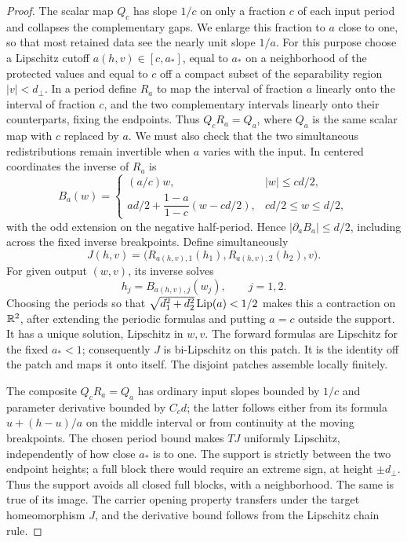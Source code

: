 \begin{proof}
The scalar map $Q_c$ has slope $1/c$ on only a fraction $c$ of each
input period and collapses the complementary gaps.  We enlarge this
fraction to $a$ close to one, so that most retained data see the nearly
unit slope $1/a$.  For this purpose choose a Lipschitz cutoff
$a(h,v)\in[c,a_*]$, equal to $a_*$ on a
neighborhood of the protected values and equal to $c$ off a compact
subset of the separability region $|v|<d_\perp$.  In a period define
$R_a$ to map the interval of fraction $a$ linearly onto the interval of
fraction $c$, and the two complementary intervals linearly onto their
counterparts, fixing the endpoints.  Thus $Q_cR_a=Q_a$, where $Q_a$
is the same scalar map with $c$ replaced by $a$.
We must also check that the two simultaneous redistributions remain
invertible when $a$ varies with the input.  In centered coordinates
the inverse of $R_a$ is
\[
 B_a(w)=
 \begin{cases}
 (a/c)w,&|w|\leq cd/2,\\
 ad/2+\dfrac{1-a}{1-c}(w-cd/2),&cd/2\leq w\leq d/2,
 \end{cases}
\]
with the odd extension on the negative half-period.  Hence
$|\partial_a B_a|\leq d/2$, including across the fixed inverse
breakpoints.  Define simultaneously
\[
 J(h,v)=\bigl(R_{a(h,v),1}(h_1),R_{a(h,v),2}(h_2),v\bigr).
\]
For given output $(w,v)$, its inverse solves
\[
 h_j=B_{a(h,v),j}(w_j),\qquad j=1,2.
\]
Choosing the periods so that
$\sqrt{d_1^2+d_2^2}\operatorname{Lip}(a)<1/2$ makes this a contraction on $\mathbb R^2$,
after extending the periodic formulas and putting $a=c$ outside the
support.  It has a unique solution, Lipschitz in $w,v$.  The forward
formulas are Lipschitz for the fixed $a_*<1$; consequently $J$ is
bi-Lipschitz on this patch.  It is the identity off the patch and maps
it onto itself.  The disjoint patches assemble locally finitely.

The composite $Q_cR_a=Q_a$ has ordinary input slopes bounded
by $1/c$ and parameter derivative bounded by $C_cd$; the latter follows
either from its formula $u+(h-u)/a$ on the middle interval or from
continuity at the moving breakpoints.  The chosen period bound makes
$TJ$ uniformly Lipschitz, independently of how close $a_*$ is to one.
The support is strictly between the two endpoint heights; a full block
there would require an extreme sign, at height $\pm d_\perp$.
Thus the support avoids all closed full blocks, with a neighborhood.
The same is true of its image.  The carrier opening property transfers
under the target homeomorphism $J$, and the derivative bound follows
from the Lipschitz chain rule.


\end{proof}
